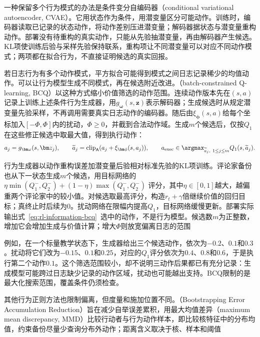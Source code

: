 一种保留多个行为模式的办法是条件变分自编码器（conditional variational autoencoder, CVAE）。它用状态作为条件，用潜变量区分可能动作。训练时，编码器读取已记录的状态动作，将动作差别压进潜变量；解码器据状态与潜变量重构动作。部署没有待重构的真实动作，只能从先验抽潜变量，再由解码器产生候选。KL项使训练后验与采样先验保持联系，重构项让不同潜变量可以对应不同动作模式；两项都在拟合行为，不直接证明候选的真实回报。

若日志行为有多个动作模式，平方拟合可能得到模式之间日志记录稀少的均值动作。可以让行为模型生成不同模式，再在候选附近改进。（batch-constrained Q-learning, BCQ）以这种方式缩小价值筛选的动作范围。连续动作版本先在$(s,a)$记录上训练上述条件行为生成器，用$g_{\bm\omega}(s,\bm z)$表示解码器；生成候选时从规定潜变量先验采样，不再调用需要真实日志动作的编码器。随后由$\xi_{\bm\phi}(s,a)$给每个坐标加入$[-\Phi,\Phi]$内的扰动，$\Phi\geq0$，并截到合法动作域。生成$m$个候选后，仅按$Q_1$在这些修正候选中取最大值，得到执行动作：
\begin{equation}
  \label{eq:rl-information-bcq}
  a_j=g_{\bm\omega}(s,\bm z_j),\qquad
  \widetilde a_j=\operatorname{clip}_{\mathsf A}
                  (a_j+\xi_{\bm\phi}(s,a_j)),\qquad
  a_{\mathrm{exec}}\in\argmax_{\widetilde a_j,\ 1\leq j\leq m}
                  Q_1(s,\widetilde a_j).
\end{equation}

行为生成器以动作重构误差加潜变量后验相对标准先验的KL项训练。评论家备份也从下一状态生成$m$个候选，用目标网络的
$\eta\min(Q_1^-,Q_2^-)+(1-\eta)\max(Q_1^-,Q_2^-)$
评分，其中$\eta\in[0,1]$越大，越偏重两个评论家中的较小值。对候选取最高评分，构造$r_t+\gamma$倍继续价值的回归目标；真终止时后续为0。扰动网络在限幅内提高$Q_1$，目标网络缓慢更新。部署实际输出式~\eqref{eq:rl-information-bcq}~选中的动作，不是行为模型。候选数$m$为正整数，增加它会增加生成与价值计算；增大$\Phi$则放宽偏离日志的范围

例如，在一个标量教学状态下，生成器给出三个候选动作，依次为$-0.2$、$0.1$和$0.3$。扰动将它们改为$-0.15$、$0.1$和$0.25$，对应的$Q_1$评分依次为$0.4$、$0.8$和$0.6$，于是执行第二个动作$0.1$。这个筛选范围较小，却不说明三动作后果都已有充分记录：生成模型可能跨过日志缺少记录的动作区域，扰动也可能越出支持。BCQ限制的是最大化搜索范围，覆盖条件仍须检查。

其他行为正则方法也限制偏离，但度量和施加位置不同。（Bootstrapping Error Accumulation Reduction）旨在减少自举误差累积，用最大均值差异（maximum mean discrepancy, MMD）比较行动者与行为动作样本，即比较核特征中的分布均值，约束备份尽量少查询分布外动作；距离含义取决于核、样本和阈值

